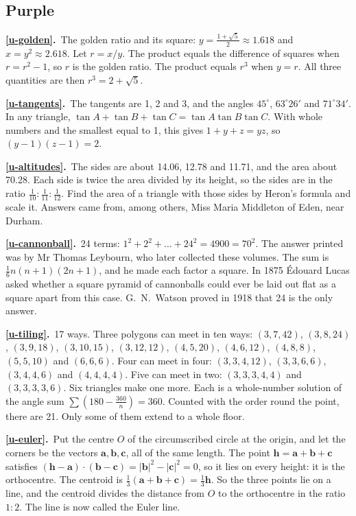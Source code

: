 \documentclass[11pt,a4paper]{article}
\newcommand{\ans}[2]{\par\smallskip\noindent\textbf{\ref{#1}.}\ #2}
\begin{document}
\subsection*{\color{bandpurple}Purple}
\ans{u-golden}{The golden ratio and its square: $y = \tfrac{1+\sqrt5}{2} \approx 1.618$
and $x = y^2 \approx 2.618$. Let $r = x/y$. The product equals the difference of squares
when $r = r^2 - 1$, so $r$ is the golden ratio. The product equals $r^3$ when $y = r$.
All three quantities are then $r^3 = 2 + \sqrt5$.}
\ans{u-tangents}{The tangents are 1, 2 and 3, and the angles $45^\circ$,
$63^\circ26'$ and $71^\circ34'$. In any triangle,
$\tan A + \tan B + \tan C = \tan A\tan B\tan C$. With whole numbers and the smallest equal
to 1, this gives $1 + y + z = yz$, so $(y - 1)(z - 1) = 2$.}
\ans{u-altitudes}{The sides are about 14.06, 12.78 and 11.71, and the area about 70.28.
Each side is twice the area divided by its height, so the sides are in the ratio
$\tfrac1{10} : \tfrac1{11} : \tfrac1{12}$. Find the area of a triangle with those sides by
Heron's formula and scale it. Answers came from, among others, Miss Maria Middleton of
Eden, near Durham.}
\ans{u-cannonball}{24 terms: $1^2 + 2^2 + \dots + 24^2 = 4900 = 70^2$. The answer printed
was by Mr Thomas Leybourn, who later collected these volumes. The sum is
$\tfrac16n(n+1)(2n+1)$, and he made each factor a square. In 1875 \'Edouard Lucas asked
whether a square pyramid of cannonballs could ever be laid out flat as a square apart
from this case. G.~N.~Watson proved in 1918 that 24 is the only answer.}
\ans{u-tiling}{17 ways. Three polygons can meet in ten ways: $(3,7,42)$, $(3,8,24)$,
$(3,9,18)$, $(3,10,15)$, $(3,12,12)$, $(4,5,20)$, $(4,6,12)$, $(4,8,8)$, $(5,5,10)$ and
$(6,6,6)$. Four can meet in four: $(3,3,4,12)$, $(3,3,6,6)$, $(3,4,4,6)$ and $(4,4,4,4)$.
Five can meet in two: $(3,3,3,4,4)$ and $(3,3,3,3,6)$. Six triangles make one more. Each
is a whole-number solution of the angle sum $\sum\left(180 - \tfrac{360}{n}\right) = 360$.
Counted with the order round the point, there are 21. Only some of them extend to a whole
floor.}
\ans{u-euler}{Put the centre $O$ of the circumscribed circle at the origin, and let the
corners be the vectors $\mathbf a, \mathbf b, \mathbf c$, all of the same length. The
point $\mathbf h = \mathbf a + \mathbf b + \mathbf c$ satisfies
$(\mathbf h - \mathbf a)\cdot(\mathbf b - \mathbf c) = |\mathbf b|^2 - |\mathbf c|^2 = 0$,
so it lies on every height: it is the orthocentre. The centroid is
$\tfrac13(\mathbf a + \mathbf b + \mathbf c) = \tfrac13\mathbf h$. So the three points lie
on a line, and the centroid divides the distance from $O$ to the orthocentre in the ratio
$1 : 2$. The line is now called the Euler line.}
\end{document}
